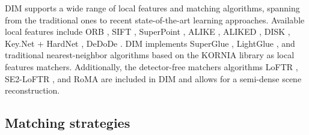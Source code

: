 DIM supports a wide range of local features and matching algorithms, spanning from the traditional ones to recent state-of-the-art learning approaches. 
Available local features include ORB \citep{Rublee2011}, SIFT \citep{Lowe2004}, SuperPoint \citep{DeTone_2018}, 
ALIKE \citep{zhao2022alike}, ALIKED \citep{zhao2023aliked}, DISK \citep{tyszkiewicz2020disk},
Key.Net \citep{barrosolaguna2019keynet} + HardNet \citep{pultar2020improving}, DeDoDe \citep{edstedt2024dedode}.
DIM implements SuperGlue \citep{sarlin2020superglue}, LightGlue \citep{lindenberger2023lightglue}, and traditional nearest-neighbor algorithms based on the KORNIA library \citep{riba2019kornia} as local features matchers. 
Additionally, the detector-free matchers algorithms LoFTR \citep{sun2021_loftr}, SE2-LoFTR \citep{Bkman2022_se2loftr}, and RoMA \citep{edstedt2023roma} are included in DIM and allows for a semi-dense scene reconstruction.

\subsection{Matching strategies}\label{sec:5:matching_stategies}

